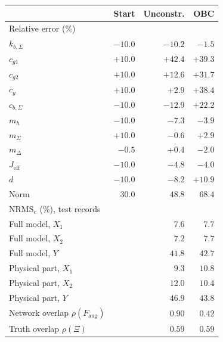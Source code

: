 \setlength{\tabcolsep}{4pt}
\begin{tabular}{l r r r}
\toprule
 & Start & Unconstr. & OBC\\
\midrule
\multicolumn{4}{l}{Relative error (\%)}\\
$k_{b,\Sigma}$ & $-10.0$ & $-10.2$ & $-1.5$\\
$c_{g1}$ & $+10.0$ & $+42.4$ & $+39.3$\\
$c_{g2}$ & $+10.0$ & $+12.6$ & $+31.7$\\
$c_y$ & $+10.0$ & $+2.9$ & $+38.4$\\
$c_{b,\Sigma}$ & $-10.0$ & $-12.9$ & $+22.2$\\
$m_h$ & $-10.0$ & $-7.3$ & $-3.9$\\
$m_\Sigma$ & $+10.0$ & $-0.6$ & $+2.9$\\
$m_\Delta$ & $-0.5$ & $+0.4$ & $-2.0$\\
$J_{\mathrm{eff}}$ & $-10.0$ & $-4.8$ & $-4.0$\\
$d$ & $-10.0$ & $-8.2$ & $+10.9$\\
Norm & $30.0$ & $48.8$ & $68.4$\\
\midrule
\multicolumn{4}{l}{$\mathrm{NRMS}_e$ (\%), test records}\\
Full model, $X_1$ &  & $7.6$ & $7.7$\\
Full model, $X_2$ &  & $7.2$ & $7.7$\\
Full model, $Y$ &  & $41.8$ & $42.7$\\
Physical part, $X_1$ &  & $9.3$ & $10.8$\\
Physical part, $X_2$ &  & $12.0$ & $10.4$\\
Physical part, $Y$ &  & $46.9$ & $43.8$\\
\midrule
Network overlap $\rho(F_{\mathrm{aug}})$ &  & $0.90$ & $0.42$\\
Truth overlap $\rho(\Xi)$ &  & $0.59$ & $0.59$\\
\bottomrule
\end{tabular}
